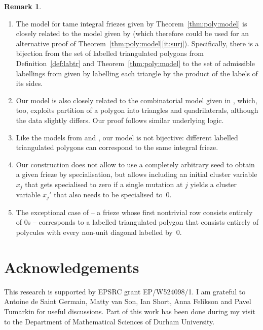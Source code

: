 \documentclass[12pt]{article}
\theoremstyle{definition}
\newtheorem{remark}{Remark}
\begin{document}
\begin{remark}
\label{remark:poly}
\begin{enumerate}[label=(\roman*)]
\item \label{remark:poly:CuntzHolm} The model for tame integral friezes given by Theorem~\ref{thm:poly:model} is closely related to the model given by \cite[Theorem 7.3]{CuntzHolmFriezes} (which therefore could be used for an alternative proof of Theorem~\ref{thm:poly:model}\ref{it:surj}). Specifically, there is a bijection from the set of labelled triangulated polygons from Definition~\ref{def:labtr} and Theorem~\ref{thm:poly:model} to the set of admissible labellings from \cite[Definition~7.1 and Theorem~7.3]{CuntzHolmFriezes} given by labelling each triangle by the product of the labels of its sides.
\item Our model is also closely related to the combinatorial model given in \cite[Section 1 and Theorem 3.2]{CuntzModel}, which, too, exploits partition of a polygon into triangles and quadrilaterals, although the data slightly differs. Our proof follows similar underlying logic.
\item Like the models from \cite{CuntzHolmFriezes} and \cite{CuntzModel}, our model is not bijective: different labelled triangulated polygons can correspond to the same integral frieze.
\item Our construction does not allow to use a completely arbitrary seed to obtain a given frieze by specialisation, but allows including an initial cluster variable $x_j$ that gets specialised to zero if a single mutation at $j$ yields a cluster variable $x_j'$ that also needs to be specialised to~0.
\item The exceptional case of \cite[Theorem 5.4 and Example 5.5]{CuntzHolmFriezes} -- a frieze whose first nontrivial row consists entirely of 0s -- corresponds to a labelled triangulated polygon that consists entirely of polycules with every non-unit diagonal labelled by~0.
\end{enumerate}
\end{remark}

\section*{Acknowledgements}
This research is supported by EPSRC grant EP/W524098/1.
I am grateful to Antoine de Saint Germain, Matty van Son, Ian Short, Anna Felikson and Pavel Tumarkin for useful discussions.
Part of this work has been done during my visit to the Department of Mathematical Sciences of Durham University.

\printbibliography
\end{document}
